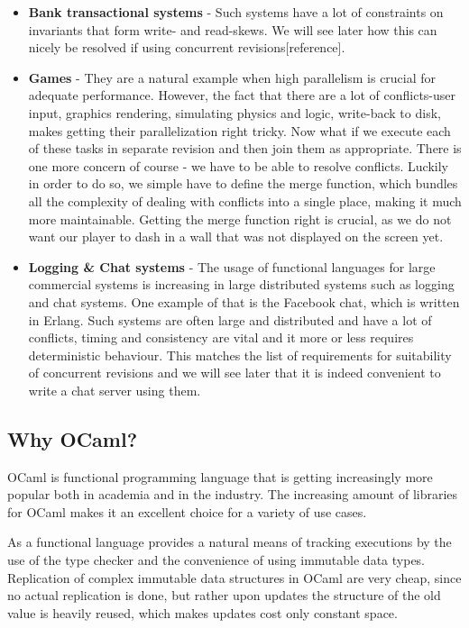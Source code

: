 \documentclass[12pt,twoside,notitlepage]{report}
\begin{document}
\begin{itemize}


\item
{\bfseries Bank transactional systems} - Such systems have a lot of constraints on invariants that form write- and read-skews. We will see later how this can nicely be resolved if using concurrent revisions[reference].

\item
{\bfseries Games} - They are a natural example when high parallelism is crucial for adequate performance. However, the fact that there are a lot of conflicts-user input, graphics rendering, simulating physics and logic, write-back to disk, makes getting their parallelization right tricky. Now what if we execute each of these tasks in separate revision and then join them as appropriate. There is one more concern of course - we have to be able to resolve conflicts. Luckily in order to do so, we simple have to define the merge function, which bundles all the complexity of dealing with conflicts into a single place, making it much more maintainable. Getting the merge function right is crucial, as we do not want our player to dash in a wall that was not displayed on the screen yet.

\item
{\bfseries Logging \& Chat systems} - The usage of functional languages for large commercial systems is increasing in large distributed systems such as logging and chat systems. One example of that is the Facebook chat, which is written in Erlang. Such systems are often large and distributed and have a lot of conflicts, timing and consistency are vital and it more or less requires deterministic behaviour. This matches the list of requirements for suitability of concurrent revisions and we will see later that it is indeed convenient to write a chat server using them.

\end{itemize}

\subsection{Why OCaml?}

OCaml is functional programming language that is getting increasingly more popular both in academia and in the industry. The increasing amount of libraries for OCaml makes it an excellent choice for a variety of use cases. 

As a functional language provides a natural means of tracking executions by the use of the type checker and the convenience of using immutable data types. Replication of complex immutable data structures in OCaml are very cheap, since no actual replication is done, but rather upon updates the structure of the old value is heavily reused, which makes updates cost only constant space.
\end{document}
